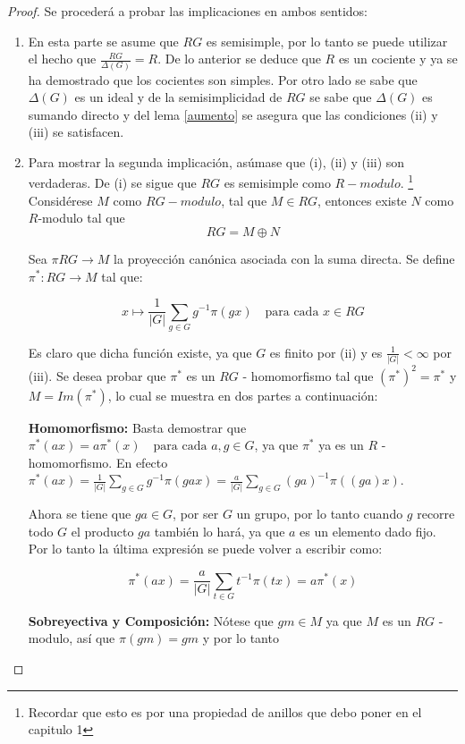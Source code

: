 \begin{proof}
Se procederá a probar las implicaciones en ambos sentidos:
\begin{enumerate}
\item En esta parte se asume que $RG$ es semisimple, por lo tanto se puede utilizar el hecho que $\frac{RG}{\Delta (G)} = R$. De lo anterior se deduce que $R$ es un cociente y ya se ha demostrado que los cocientes son simples. Por otro lado se sabe que $\Delta (G)$ es un ideal y de la semisimplicidad de $RG$ se sabe que $\Delta (G)$ es sumando directo y del lema \ref{aumento} se asegura que las condiciones (ii) y (iii) se satisfacen. 

\item  Para mostrar la segunda implicación, asúmase que (i), (ii) y (iii) son verdaderas. 
De (i) se sigue que $RG$ es semisimple como $R-modulo$. \footnote{Recordar que esto es por una propiedad de anillos que debo poner en el capitulo 1} Considérese $M$ como $RG-modulo$, tal que $M \in RG$, entonces existe $N$ como $R$-modulo tal que 
\[RG = M \oplus N\]

Sea $\pi  RG \to M$ la proyección canónica asociada con la suma directa. Se define $\pi ^ *  \colon RG \to M$ tal que:

\[x \mapsto \frac{1}{|G|}\sum_{g \in G} g^{-1}\pi (gx) \quad   \mbox{para cada } x \in RG \] 

Es claro que dicha función existe, ya que $G$ es finito por (ii) y es $\frac{1}{|G|} < \infty$ por (iii). Se desea probar que $\pi ^ * $ es un $RG$ - homomorfismo tal que $(\pi ^*)^2 = \pi ^* $ y $M = Im(\pi ^*)$, lo cual se muestra en dos partes a continuación:

\textbf{Homomorfismo:} \newline
Basta demostrar que $\pi ^* (ax) = a \pi^*(x) \quad \mbox{para cada } a, g \in G$, ya que $\pi^* $ ya es un $R$ - homomorfismo. En efecto $\pi^* (ax) = \frac{1}{|G|} \sum_{g \in G}g^{-1}\pi (gax) = \frac{a}{|G|} \sum_{g \in G}(ga)^{-1}\pi ((ga)x) $.

Ahora se tiene que $ga \in G$, por ser $G$ un grupo, por lo tanto cuando $g$ recorre todo $G$ el producto $ga$ también lo hará, ya que $a$ es un elemento dado fijo. Por lo tanto la última expresión se puede volver a escribir como:

\[\pi^* (ax) = \frac{a}{|G|} \sum_{t \in G}t^{-1}\pi (tx) = a\pi^*(x)\]

\textbf{Sobreyectiva y Composición:} \newline
Nótese que $gm \in M$ ya que $M$ es un $RG$ - modulo, así que $\pi (gm) = gm$ y por lo tanto 


\end{enumerate}
\end{proof}

